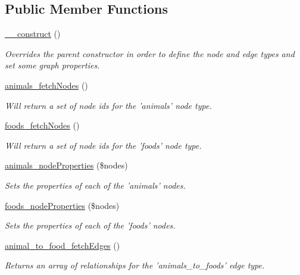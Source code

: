 \subsection*{Public Member Functions}
\begin{DoxyCompactItemize}
\item 
\hyperlink{classDemoGraph_ab9d1da5df733b032df04bdbbb899b6cc}{\_\-\_\-construct} ()
\begin{DoxyCompactList}\small\item\em Overrides the parent constructor in order to define the node and edge types and set some graph properties. \item\end{DoxyCompactList}\item 
\hyperlink{classDemoGraph_a85887991e08523bd01f00760031706b6}{animals\_\-fetchNodes} ()
\begin{DoxyCompactList}\small\item\em Will return a set of node ids for the 'animals' node type. \item\end{DoxyCompactList}\item 
\hyperlink{classDemoGraph_af949a82a5c73184229ef710bb6ed21e0}{foods\_\-fetchNodes} ()
\begin{DoxyCompactList}\small\item\em Will return a set of node ids for the 'foods' node type. \item\end{DoxyCompactList}\item 
\hyperlink{classDemoGraph_a79c83f4743457c85c4b1630664924d5d}{animals\_\-nodeProperties} (\$nodes)
\begin{DoxyCompactList}\small\item\em Sets the properties of each of the 'animals' nodes. \item\end{DoxyCompactList}\item 
\hyperlink{classDemoGraph_a4139a86614f40bc7a51b9674088bf57a}{foods\_\-nodeProperties} (\$nodes)
\begin{DoxyCompactList}\small\item\em Sets the properties of each of the 'foods' nodes. \item\end{DoxyCompactList}\item 
\hyperlink{classDemoGraph_a239ac4f1fbe7821a989fbb64c045aa7a}{animal\_\-to\_\-food\_\-fetchEdges} ()
\begin{DoxyCompactList}\small\item\em Returns an array of relationships for the 'animals\_\-to\_\-foods' edge type. \item\end{DoxyCompactList}\item 

\end{DoxyCompactItemize}

